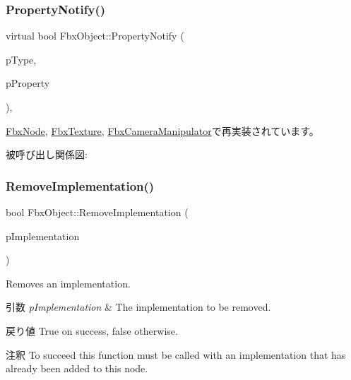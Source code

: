 \subsubsection{\texorpdfstring{Property\+Notify()}{PropertyNotify()}}
{\footnotesize\ttfamily virtual bool Fbx\+Object\+::\+Property\+Notify (\begin{DoxyParamCaption}\item[{\hyperlink{class_fbx_object_a528f1b2c2b7abbd64c525ba3a9a496b8}{E\+Property\+Notify\+Type}}]{p\+Type,  }\item[{\hyperlink{class_fbx_property}{Fbx\+Property} \&}]{p\+Property }\end{DoxyParamCaption})\hspace{0.3cm}{\ttfamily [protected]}, {\ttfamily [virtual]}}



\hyperlink{class_fbx_node_ac0edd8ef92070544e170bd0a38ed1efc}{Fbx\+Node}, \hyperlink{class_fbx_texture_af45140c7eecc9b2e133d7ee8a63fd5f5}{Fbx\+Texture}, \hyperlink{class_fbx_camera_manipulator_aa0b1cdb3a150798e03587a3adeadd87a}{Fbx\+Camera\+Manipulator}で再実装されています。

被呼び出し関係図\+:
\mbox{\label{class_fbx_object_af5372f14b186dbd1e69688e899c46081}} 
\subsubsection{\texorpdfstring{Remove\+Implementation()}{RemoveImplementation()}}
{\footnotesize\ttfamily bool Fbx\+Object\+::\+Remove\+Implementation (\begin{DoxyParamCaption}\item[{\hyperlink{class_fbx_implementation}{Fbx\+Implementation} $\ast$}]{p\+Implementation }\end{DoxyParamCaption})}

Removes an implementation. 
\begin{DoxyParams}{引数}
{\em p\+Implementation} & The implementation to be removed. \\
\hline
\end{DoxyParams}
\begin{DoxyReturn}{戻り値}
{\ttfamily True} on success, {\ttfamily false} otherwise. 
\end{DoxyReturn}
\begin{DoxyRemark}{注釈}
To succeed this function must be called with an implementation that has already been added to this node. 
\end{DoxyRemark}
\mbox{\label{class_fbx_object_aa4a97de3c9d2d74d7b58f579ad3ad453}} 
